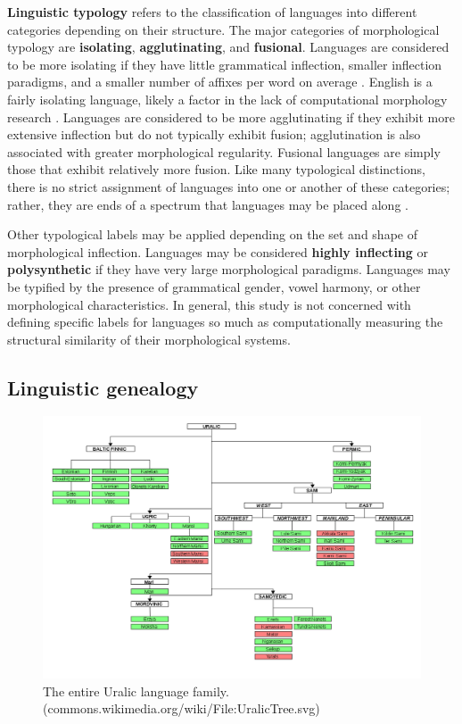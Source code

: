 \textbf{Linguistic typology} refers to the classification of languages into different categories depending on their structure. The major categories of morphological typology are \textbf{isolating}, \textbf{agglutinating}, and \textbf{fusional}. Languages are considered to be more isolating if they have little grammatical inflection, smaller inflection paradigms, and a smaller number of affixes per word on average \parencite{Hogan2010}. English is a fairly isolating language, likely a factor in the lack of computational morphology research \parencite{Cotterell2017}. Languages are considered to be more agglutinating if they exhibit more extensive inflection but do not typically exhibit fusion; agglutination is also associated with greater morphological regularity. Fusional languages are simply those that exhibit relatively more fusion. Like many typological distinctions, there is no strict assignment of languages into one or another of these categories; rather, they are ends of a spectrum that languages may be placed along \parencite{Hogan2010}.

Other typological labels may be applied depending on the set and shape of morphological inflection. Languages may be considered \textbf{highly inflecting} or \textbf{polysynthetic} if they have very large morphological paradigms. Languages may be typified by the presence of grammatical gender, vowel harmony, or other morphological characteristics. In general, this study is not concerned with defining specific labels for languages so much as computationally measuring the structural similarity of their morphological systems.

\subsection{Linguistic genealogy}

\begin{figure}[ht]
\includegraphics[width=13cm]{images/1280px-UralicTree.png}
\centering
\caption{The entire Uralic language family. \\ (commons.wikimedia.org/wiki/File:UralicTree.svg)}
\end{figure}

